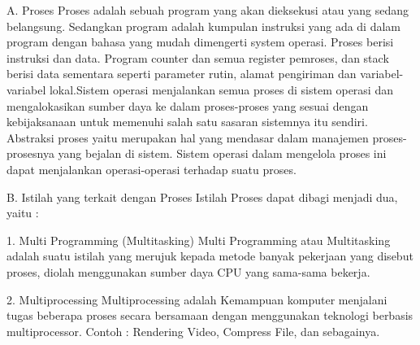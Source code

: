 A. Proses
Proses adalah sebuah program yang akan dieksekusi atau yang sedang belangsung. Sedangkan program adalah kumpulan instruksi yang ada di dalam program dengan bahasa yang mudah dimengerti system operasi. Proses berisi instruksi dan data. Program counter dan semua register pemroses, dan stack berisi data sementara seperti parameter rutin, alamat pengiriman dan variabel-variabel lokal.Sistem operasi menjalankan semua proses di sistem operasi dan mengalokasikan sumber daya ke dalam proses-proses yang sesuai dengan kebijaksanaan untuk memenuhi salah satu sasaran sistemnya itu sendiri. Abstraksi proses yaitu merupakan  hal yang mendasar dalam manajemen proses-prosesnya yang bejalan di sistem. Sistem operasi dalam mengelola proses ini dapat menjalankan operasi-operasi terhadap suatu proses.

B. Istilah yang terkait dengan Proses
Istilah Proses dapat dibagi menjadi dua, yaitu :

1. Multi Programming (Multitasking)
Multi Programming atau Multitasking adalah suatu istilah yang merujuk kepada metode banyak pekerjaan yang disebut proses, diolah menggunakan sumber daya CPU yang sama-sama bekerja.

2. Multiprocessing
Multiprocessing adalah Kemampuan komputer menjalani tugas beberapa proses secara bersamaan dengan menggunakan teknologi berbasis multiprocessor.
Contoh : Rendering Video, Compress File, dan sebagainya.


